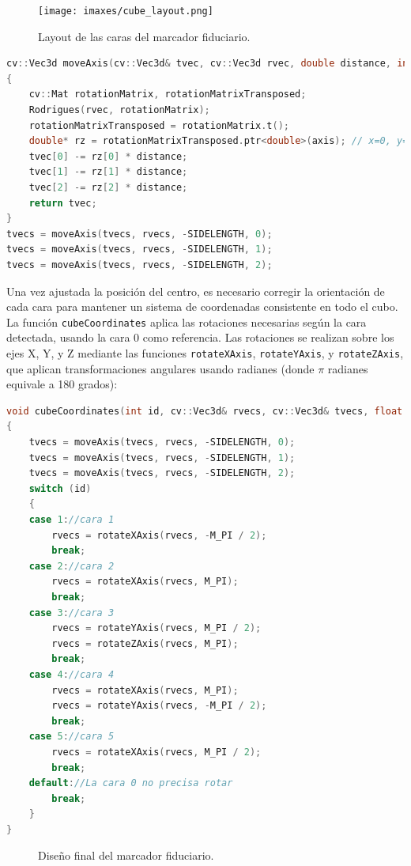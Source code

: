 \begin{figure}
  \centering
  \texttt{[image: imaxes/cube\_layout.png]}
  \caption{Layout de las caras del marcador fiduciario.}
  \label{fig:cube_layout}
\end{figure}

\begin{lstlisting}[language=C++]
cv::Vec3d moveAxis(cv::Vec3d& tvec, cv::Vec3d rvec, double distance, int axis)
{
    cv::Mat rotationMatrix, rotationMatrixTransposed;
    Rodrigues(rvec, rotationMatrix);
    rotationMatrixTransposed = rotationMatrix.t();
    double* rz = rotationMatrixTransposed.ptr<double>(axis); // x=0, y=1, z=2
    tvec[0] -= rz[0] * distance;
    tvec[1] -= rz[1] * distance;
    tvec[2] -= rz[2] * distance;
    return tvec;
}
tvecs = moveAxis(tvecs, rvecs, -SIDELENGTH, 0);
tvecs = moveAxis(tvecs, rvecs, -SIDELENGTH, 1);
tvecs = moveAxis(tvecs, rvecs, -SIDELENGTH, 2);

\end{lstlisting}

Una vez ajustada la posición del centro, es necesario corregir la orientación de cada cara para mantener un sistema de coordenadas consistente en todo el cubo. La función \texttt{cubeCoordinates} aplica las rotaciones necesarias según la cara detectada, usando la cara 0 como referencia. Las rotaciones se realizan sobre los ejes X, Y, y Z mediante las funciones \texttt{rotateXAxis}, \texttt{rotateYAxis}, y \texttt{rotateZAxis}, que aplican transformaciones angulares usando radianes (donde $\pi$ radianes equivale a 180 grados):
\begin{lstlisting}[language=C++]
void cubeCoordinates(int id, cv::Vec3d& rvecs, cv::Vec3d& tvecs, float sideLength)
{
    tvecs = moveAxis(tvecs, rvecs, -SIDELENGTH, 0);
    tvecs = moveAxis(tvecs, rvecs, -SIDELENGTH, 1);
    tvecs = moveAxis(tvecs, rvecs, -SIDELENGTH, 2);
    switch (id)
    {
    case 1://cara 1
        rvecs = rotateXAxis(rvecs, -M_PI / 2);
        break;
    case 2://cara 2
        rvecs = rotateXAxis(rvecs, M_PI);
        break;
    case 3://cara 3
        rvecs = rotateYAxis(rvecs, M_PI / 2);
        rvecs = rotateZAxis(rvecs, M_PI);
        break;
    case 4://cara 4
        rvecs = rotateXAxis(rvecs, M_PI);
        rvecs = rotateYAxis(rvecs, -M_PI / 2);
        break;
    case 5://cara 5
        rvecs = rotateXAxis(rvecs, M_PI / 2);
        break;
    default://La cara 0 no precisa rotar
        break;
    }
}
\end{lstlisting}


\begin{figure}%
    \centering
    \qquad
    \caption{Diseño final del marcador fiduciario.}%
    \label{fig:cubo_marker}%
\end{figure}

